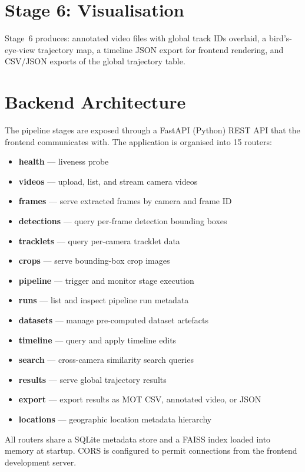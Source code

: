 \section{Stage 6: Visualisation}

Stage~6 produces: annotated video files with global track IDs overlaid, a bird's-eye-view trajectory map, a timeline JSON export for frontend rendering, and CSV/JSON exports of the global trajectory table.

\section{Backend Architecture}

The pipeline stages are exposed through a FastAPI (Python) REST API that the frontend communicates with. The application is organised into 15 routers:

\begin{itemize}
    \item \textbf{health} --- liveness probe
    \item \textbf{videos} --- upload, list, and stream camera videos
    \item \textbf{frames} --- serve extracted frames by camera and frame ID
    \item \textbf{detections} --- query per-frame detection bounding boxes
    \item \textbf{tracklets} --- query per-camera tracklet data
    \item \textbf{crops} --- serve bounding-box crop images
    \item \textbf{pipeline} --- trigger and monitor stage execution
    \item \textbf{runs} --- list and inspect pipeline run metadata
    \item \textbf{datasets} --- manage pre-computed dataset artefacts
    \item \textbf{timeline} --- query and apply timeline edits
    \item \textbf{search} --- cross-camera similarity search queries
    \item \textbf{results} --- serve global trajectory results
    \item \textbf{export} --- export results as MOT CSV, annotated video, or JSON
    \item \textbf{locations} --- geographic location metadata hierarchy
\end{itemize}

All routers share a SQLite metadata store and a FAISS index loaded into memory at startup. CORS is configured to permit connections from the frontend development server.

